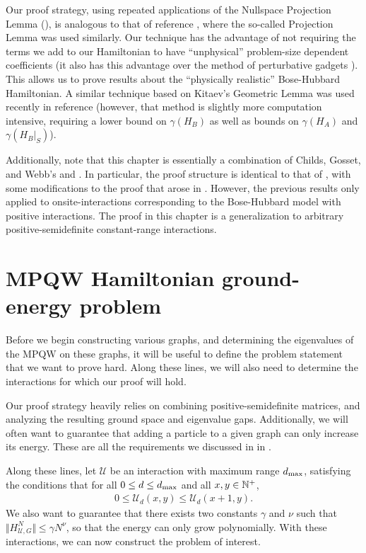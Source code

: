 \documentclass[../thesis-main/thesis-main]{subfiles}
\begin{document}
Our proof strategy, using repeated applications of the Nullspace Projection Lemma (), is analogous to that of reference \cite{KKR04}, where the so-called Projection Lemma was used similarly. Our technique has the advantage of not requiring the terms we add to our Hamiltonian to have ``unphysical'' problem-size dependent coefficients (it also has this advantage over the method of perturbative gadgets \cite{KKR04}). This allows us to prove results about the ``physically realistic'' Bose-Hubbard Hamiltonian. A similar technique based on Kitaev's Geometric Lemma was used recently in reference \cite{GN13} (however, that method is slightly more computation intensive, requiring a lower bound on $\gamma(H_{B})$ as well as bounds on $\gamma(H_{A})$ and $\gamma(H_{B}|_{S})$).

Additionally, note that this chapter is essentially a combination of Childs, Gosset, and Webb's \cite{BHQMA} and \cite{XYQMA}.  In particular, the proof structure is identical to that of \cite{BHQMA}, with some modifications to the proof that arose in \cite{XYQMA}.  However, the previous results only applied to onsite-interactions corresponding to the Bose-Hubbard model with positive interactions.  The proof in this chapter is a generalization to arbitrary positive-semidefinite constant-range interactions.

\section{MPQW Hamiltonian ground-energy problem}

Before we begin constructing various graphs, and determining the eigenvalues of the MPQW on these graphs, it will be useful to define the problem statement that we want to prove hard.  Along these lines, we will also need to determine the interactions for which our proof will hold.

Our proof strategy heavily relies on combining positive-semidefinite matrices, and analyzing the resulting ground space and eigenvalue gaps.  Additionally, we will often want to guarantee that adding a particle to a given graph can only increase its energy.  These are all the requirements we discussed in  in .

Along these lines, let $\mathcal{U}$ be an interaction with maximum range $d_{\text{max}}$, satisfying the conditions that for all $0\leq d\leq d_{\text{max}}$ and all $x,y\in \mathbb{N}^+$,
\begin{align}
  0 \leq \mathcal{U}_d(x,y) \leq \mathcal{U}_d(x+1,y).
\end{align}
We also want to guarantee that there exists two constants $\gamma$ and $\nu$ such that $\Vert H_{\mathcal{U},G}^N \Vert \leq \gamma N^\nu$, so that the energy can only grow polynomially.  With these interactions, we can now construct the problem of interest. 
\end{document}
